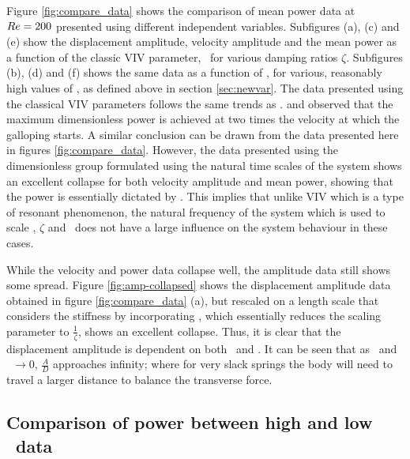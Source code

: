  
 Figure \ref{fig:compare_data} shows the comparison of mean power data at $Re=200$ presented using different independent variables. Subfigures (a), (c) and (e) show the displacement amplitude, velocity amplitude and the mean power as a function of the classic VIV parameter, \ustar \ for various damping ratios $\zeta$. Subfigures (b), (d) and (f) shows the same data as a function of \massdamp, for various, reasonably high values of \massstiff, as defined above in section \ref{sec:newvar}. The data presented using the classical VIV parameters follows the same trends as \cite{Barrero-Gil2010a}. \citet{Barrero-Gil2010a} and \citet{vicente-Ludlam2014} observed that the maximum dimensionless power is achieved at two times the velocity at which the galloping starts. A similar conclusion can be drawn from the data presented here in figures \ref{fig:compare_data}. However, the data presented using the dimensionless group formulated using the natural time scales of the system shows an excellent collapse for both velocity amplitude and mean power, showing that the power is essentially dictated by \massdamp. This implies that unlike VIV which is a type of resonant phenomenon, the natural frequency of the system which is used to scale \ustar, $\zeta$ and \massstiff\ does not have a large influence on the system behaviour in these cases.
 
 
 
 
  
  
 
While the velocity and power data collapse well, the amplitude data still shows some spread. Figure \ref{fig:amp-collapsed} shows the displacement amplitude data obtained in figure \ref{fig:compare_data} (a), but rescaled on a length scale that considers the stiffness by incorporating \massstiff, which essentially reduces the scaling parameter to $\frac{1}{\zeta}$, shows an excellent collapse. Thus, it is clear that the displacement amplitude is dependent on both \massstiff\ and \massdamp. It can be seen that as \massstiff\ and \massdamp\ $\rightarrow 0$, $\frac{A}{D}$ approaches infinity; where for very slack springs the body will need to travel a larger distance to balance the transverse force. 


 \subsection{Comparison of power between high and low \reynoldsnumber\ data}   

